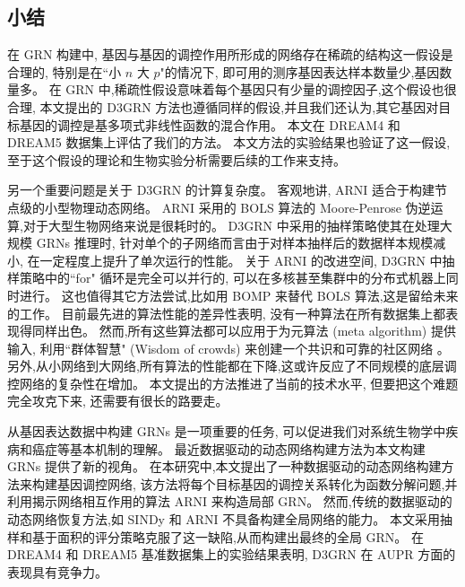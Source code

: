\subsection{小结}

在 GRN 构建中, 基因与基因的调控作用所形成的网络存在稀疏的结构这一假设是合理的,
特别是在``小 $n$ 大 $p$"的情况下, 即可用的测序基因表达样本数量少,基因数量多。
在 GRN 中,稀疏性假设意味着每个基因只有少量的调控因子,这个假设也很合理,
本文提出的 D3GRN 方法也遵循同样的假设,并且我们还认为,其它基因对目标基因的调控是基多项式非线性函数的混合作用。
本文在 DREAM4 和 DREAM5 数据集上评估了我们的方法。
本文方法的实验结果也验证了这一假设,至于这个假设的理论和生物实验分析需要后续的工作来支持。

另一个重要问题是关于 D3GRN 的计算复杂度。
客观地讲, ARNI 适合于构建节点级的小型物理动态网络。
ARNI 采用的 BOLS 算法的 Moore-Penrose 伪逆运算,对于大型生物网络来说是很耗时的。
D3GRN 中采用的抽样策略使其在处理大规模 GRNs 推理时,
针对单个的子网络而言由于对样本抽样后的数据样本规模减小,
在一定程度上提升了单次运行的性能。
关于 ARNI 的改进空间, D3GRN 中抽样策略中的``for" 循环是完全可以并行的,
可以在多核甚至集群中的分布式机器上同时进行。
这也值得其它方法尝试,比如用 BOMP 来替代 BOLS 算法,这是留给未来的工作。
目前最先进的算法性能的差异性表明,
没有一种算法在所有数据集上都表现得同样出色。
然而,所有这些算法都可以应用于为元算法 (meta algorithm) 提供输入,
利用``群体智慧" (Wisdom of crowds) 来创建一个共识和可靠的社区网络 。
另外,从小网络到大网络,所有算法的性能都在下降,这或许反应了不同规模的底层调控网络的复杂性在增加。
本文提出的方法推进了当前的技术水平, 但要把这个难题完全攻克下来, 还需要有很长的路要走。

从基因表达数据中构建 GRNs 是一项重要的任务,
可以促进我们对系统生物学中疾病和癌症等基本机制的理解。
最近数据驱动的动态网络构建方法为本文构建 GRNs 提供了新的视角。
在本研究中,本文提出了一种数据驱动的动态网络构建方法来构建基因调控网络,
该方法将每个目标基因的调控关系转化为函数分解问题,并利用揭示网络相互作用的算法 ARNI 来构造局部 GRN。
然而,传统的数据驱动的动态网络恢复方法,如 SINDy 和 ARNI 不具备构建全局网络的能力。
本文采用抽样和基于面积的评分策略克服了这一缺陷,从而构建出最终的全局 GRN。
在 DREAM4 和 DREAM5 基准数据集上的实验结果表明, D3GRN 在 AUPR 方面的表现具有竞争力。